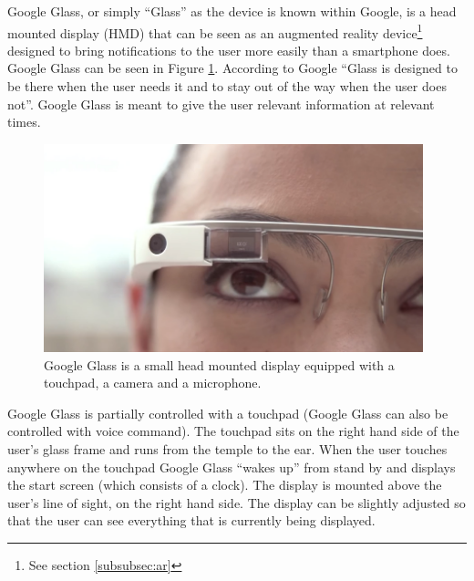 Google Glass, or simply ``Glass'' as the device is known within Google, is a head mounted display (HMD) that can be seen as an augmented reality device\footnote{See section \ref{subsubsec:ar}} designed to bring notifications to the user more easily than a smartphone does. Google Glass can be seen in Figure \ref{GoogleGlassHardware}. According to Google ``Glass is designed to be there when the user needs it and to stay out of the way when the user does not''.\cite{glassDesignPrinciples} Google Glass is meant to give the user relevant information at relevant times.\\ 

	\begin{figure}[ht!]
		\centering
		\includegraphics[width=110mm]{images/GoogleGlassHardware}
		\caption{Google Glass is a small head mounted display equipped with a touchpad, a camera and a microphone.\cite{ImagesGoogleGlassUI}}
		\label{GoogleGlassHardware}
	\end{figure}

Google Glass is partially controlled with a touchpad (Google Glass can also be controlled with voice command). The touchpad sits on the right hand side of the user's glass frame and runs from the temple to the ear. When the user touches anywhere on the touchpad Google Glass ``wakes up'' from stand by and displays the start screen (which consists of a clock). The display is mounted above the user's line of sight, on the right hand side. The display can be slightly adjusted so that the user can see everything that is currently being displayed. 

